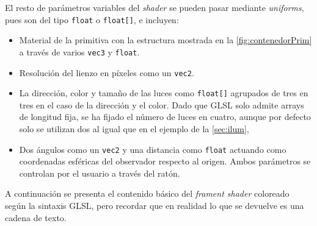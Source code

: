 El resto de parámetros variables del \textit{shader} se pueden pasar mediante \textit{uniforms}, pues son del tipo \texttt{float} o \texttt{float[]}, e incluyen:
\begin{itemize}
    \item Material de la primitiva con la estructura mostrada en la \autoref{fig:contenedorPrim} a través de varios \texttt{vec3} y \texttt{float}. 
    \item Resolución del lienzo en píxeles como un \texttt{vec2}.
    \item La dirección, color y tamaño de las luces como \texttt{float[]} agrupados de tres en tres en el caso de la dirección y el color. Dado que GLSL solo admite arrays de longitud fija, se ha fijado el número de luces en cuatro, aunque por defecto solo se utilizan dos al igual que en el ejemplo de la \autoref{sec:ilum},
    \item Dos ángulos como un \texttt{vec2} y una distancia como \texttt{float} actuando como coordenadas esféricas del observador respecto al origen. Ambos parámetros se controlan por el usuario a través del ratón.
\end{itemize}
A continuación se presenta el contenido básico del \textit{frament shader} coloreado según la sintaxis GLSL, pero recordar que en realidad lo que se devuelve es una cadena de texto.

